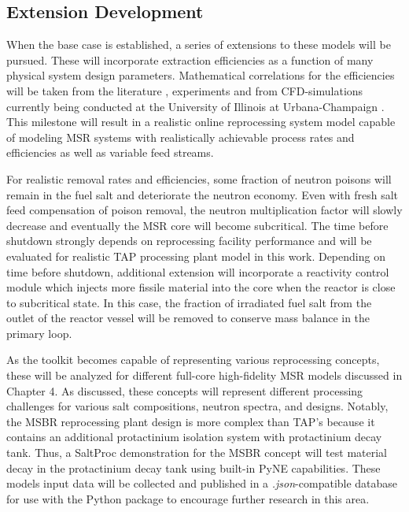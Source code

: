 \subsection{Extension Development}
When the base case is established, a series of extensions to 
these models will be pursued. These will incorporate extraction 
efficiencies as a function of many physical system design 
parameters. Mathematical correlations for the efficiencies will 
be taken from the literature \cite{gabbard_development_1974}, 
experiments and from CFD-simulations currently being conducted at 
the University of Illinois at Urbana-Champaign \cite{huff_enabling_2018}.
This milestone will result in a realistic online reprocessing system 
model capable of modeling \gls{MSR} systems with realistically achievable 
process rates and efficiencies as well as variable feed streams. 

For realistic removal rates and efficiencies, some fraction of neutron 
poisons will remain in the fuel salt and deteriorate the neutron 
economy. Even with fresh salt feed compensation of poison removal, 
the neutron multiplication factor will slowly decrease and 
eventually the \gls{MSR} core will become subcritical. The time before 
shutdown strongly depends on reprocessing facility performance 
and will be evaluated for realistic \gls{TAP} processing plant model 
in this work. Depending on time before shutdown, additional 
extension will 
incorporate a reactivity control module which injects more fissile 
material into the core when the reactor is close to subcritical state. 
In this case, the fraction of irradiated fuel salt from the outlet of 
the reactor vessel will be removed to conserve mass balance in the 
primary loop.

As the toolkit becomes capable of representing various reprocessing 
concepts, these will be analyzed for different full-core 
high-fidelity \gls{MSR} models discussed in Chapter 4. As discussed, 
these concepts will represent different processing challenges 
for various salt compositions, neutron spectra, and designs. 
Notably, the \gls{MSBR} reprocessing plant design is more complex 
than \gls{TAP}'s because it contains an additional protactinium 
isolation system with protactinium decay tank. Thus, a SaltProc 
demonstration for the \gls{MSBR} concept will test material decay 
in the protactinium decay tank using built-in PyNE capabilities. 
These models input data will be collected and 
published in a \textit{.json}-compatible database for use with the 
Python package to encourage further research in this area.

